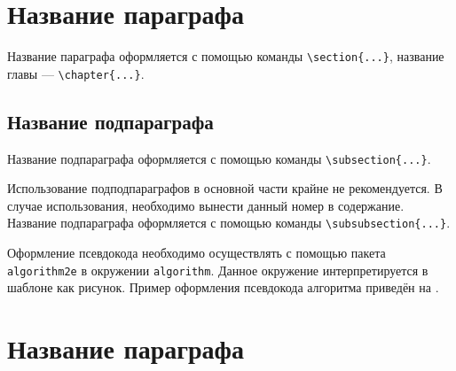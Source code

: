 	
\section{Название параграфа} \label{ch2:sec-abbr} %
	
Название параграфа оформляется с помощью команды \verb|\section{...}|, название главы --- \verb|\chapter{...}|. 
	

\subsection{Название подпараграфа} \label{ch2:subsec-title-abbr} %


Название подпараграфа оформляется с помощью команды  \texttt{\textbackslash{}subsection\{...\}}.


	
Использование подподпараграфов в основной части крайне не рекомендуется. В случае использования, необходимо вынести данный номер в содержание.	
Название подпараграфа оформляется с помощью команды  \texttt{\textbackslash{}subsubsecti\-on\{...\}}.




	
Оформление псевдокода необходимо осуществлять с помощью пакета \verb|algorithm2e| в окружении \verb|algorithm|. Данное окружение интерпретируется в шаблоне как рисунок. Пример оформления псевдокода алгоритма приведён на . 
	
	

	
\section{Название параграфа} \label{ch2:sec-very-short-title} %


